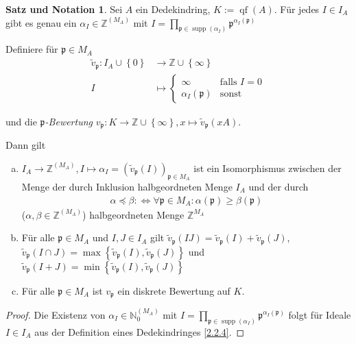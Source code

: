 \documentclass[
twoside=semi,
fontsize=12,
DIV=12, 
cleardoublepage=current,
leqno,
headings=optiontoheadandtoc, 
toc=idx
]{scrbook}
\newcommand{\N}{\mathbb{N}}
\newcommand{\Z}{\mathbb{Z}}
\newcommand{\set}[1]{\left\{ #1 \right\}}
\DeclareMathOperator{\supp}{supp}
\DeclareMathOperator{\qf}{qf}
\theoremstyle{definition}
\newtheorem{satz-not}[definition]{Satz und Notation}
\begin{document}
 	\begin{satz-not}\label{2.6.4}\hfill\newline
 		Sei $A$ ein Dedekindring, $K:= \qf(A)$. F\"ur jedes $I \in I_A$ gibt es genau ein $\alpha_I \in \Z^{(M_A)}$ mit $\displaystyle I=\prod_{\mathfrak{p} \in \supp(\alpha_I)} \mathfrak{p}^{\alpha_I(\mathfrak{p})}$
 		
 		\medskip\noindent 
 		Definiere f\"ur $\mathfrak{p} \in M_A$ 
 		\begin{align*}
 			\tilde{v}_\mathfrak{p}: I_A \cup \set{0} &\to \Z \cup \set{\infty}\\
 			I &\mapsto \begin{cases}
 			\infty & \textrm{falls } I = 0\\
 			\alpha_I(\mathfrak{p}) & \textrm{sonst}
 			\end{cases}
 		\end{align*}
 	
 		und die \emph{$\mathfrak{p}$-Bewertung} $v_\mathfrak{p}: K \to \Z \cup \set{\infty}, x \mapsto \tilde{v}_\mathfrak{p}(xA)$.
 		
 		Dann gilt 
 		\begin{enumerate}[(a)]
 			\item 
 			$I_A \to \Z^{(M_A)}, I \mapsto \alpha_I = (\tilde{v}_\mathfrak{p}(I))_{\mathfrak{p} \in M_A}$ ist ein Isomorphismus zwischen der Menge der durch Inklusion halbgeordneten Menge $I_A$ und der durch
 			\begin{align}
 				\alpha \preceq \beta : \Longleftrightarrow \forall \mathfrak{p} \in M_A: \alpha(\mathfrak{p}) \geq \beta(\mathfrak{p}) \label{2.6.4.1}\tag{$*$}
 			\end{align}
 			 ($\alpha, \beta \in \Z^{(M_A)}$) halbgeordneten Menge $\Z^{M_A}$
 			
 			\item
 			F\"ur alle $\mathfrak{p} \in M_A$ und $I, J \in I_A$ gilt $\tilde{v}_\mathfrak{p}(IJ) = \tilde{v}_\mathfrak{p}(I) + \tilde{v}_\mathfrak{p}(J)$, $\tilde{v}_\mathfrak{p}(I\cap J) = \max \set{\tilde{v}_\mathfrak{p}(I), \tilde{v}_\mathfrak{p}(J)}$ und $\tilde{v}_\mathfrak{p}(I+J) = \min \set{\tilde{v}_\mathfrak{p}(I), \tilde{v}_\mathfrak{p}(J)}$
 			
 			\item F\"ur alle $\mathfrak{p} \in M_A$ ist $v_\mathfrak{p}$ ein diskrete Bewertung auf $K$. 
 		\end{enumerate}
 	
 		\begin{proof}
 			Die Existenz von $\alpha_I \in \N_0^{(M_A)}$ mit $I = \prod_{\mathfrak{p} \in \supp(\alpha_I)} \mathfrak{p}^{\alpha_I(\mathfrak{p})}$ folgt f\"ur Ideale $I \in I_A$ aus der Definition eines Dedekindringes \ref{2.2.4}. 
 			

\end{proof}
\end{satz-not}
\end{document}
